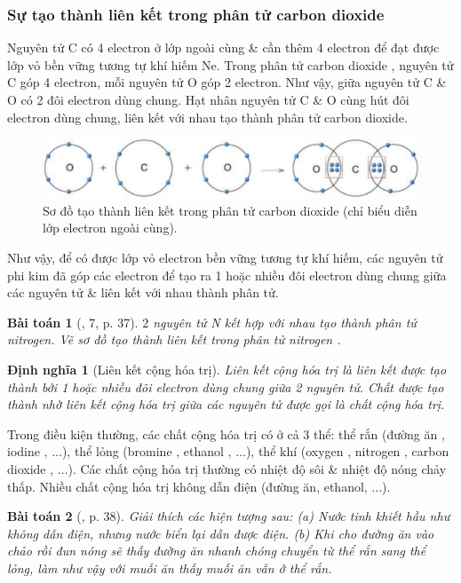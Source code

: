 \documentclass{article}
\newtheorem{baitoan}{Bài toán}
\newtheorem{dinhnghia}{Định nghĩa}
\begin{document}
\subsubsection{Sự tạo thành liên kết trong phân tử carbon dioxide}
Nguyên tử C có 4 electron ở lớp ngoài cùng \& cần thêm 4 electron để đạt được lớp vỏ bền vững tương tự khí hiếm Ne. Trong phân tử carbon dioxide , nguyên tử C góp 4 electron, mỗi nguyên tử O góp 2 electron. Như vậy, giữa nguyên tử C \& O có 2 đôi electron dùng chung. Hạt nhân nguyên tử C \& O cùng hút đôi electron dùng chung, liên kết với nhau tạo thành phân tử carbon dioxide.
\begin{figure}[H]
	\centering
	\includegraphics[scale=0.3]{carbon_dioxide}
	\caption{Sơ đồ tạo thành liên kết trong phân tử carbon dioxide  (chỉ biểu diễn lớp electron ngoài cùng).}
\end{figure}
Như vậy, để có được lớp vỏ electron bền vững tương tự khí hiếm, các nguyên tử phi kim đã góp các electron để tạo ra 1 hoặc nhiều đôi electron dùng chung giữa các nguyên tử \& liên kết với nhau thành phân tử.

\begin{baitoan}[\cite{SGK_KHTN_7_Canh_Dieu}, 7, p. 37]
	$2$ nguyên tử \emph{N} kết hợp với nhau tạo thành phân tử nitrogen. Vẽ sơ đồ tạo thành liên kết trong phân tử nitrogen \emph{}.
\end{baitoan}

\begin{dinhnghia}[Liên kết cộng hóa trị]
	\emph{Liên kết cộng hóa trị} là liên kết được tạo thành bởi 1 hoặc nhiều đôi electron dùng chung giữa 2 nguyên tử. Chất được tạo thành nhờ liên kết cộng hóa trị giữa các nguyên tử được gọi là \emph{chất cộng hóa trị}.
\end{dinhnghia}
Trong điều kiện thường, các chất cộng hóa trị có ở cả 3 thể: thể rắn (đường ăn , iodine , $\ldots$), thể lỏng (bromine , ethanol , $\ldots$), thể khí (oxygen , nitrogen , carbon dioxide , $\ldots$). Các chất cộng hóa trị thường có nhiệt độ sôi \& nhiệt độ nóng chảy thấp. Nhiều chất cộng hóa trị không dẫn điện (đường ăn, ethanol, $\ldots$).

\begin{baitoan}[\cite{SGK_KHTN_7_Canh_Dieu}, p. 38]
	Giải thích các hiện tượng sau: (a) Nước tinh khiết hầu như không dẫn điện, nhưng nước biển lại dẫn được điện. (b) Khi cho đường ăn vào chảo rồi đun nóng sẽ thấy đường ăn nhanh chóng chuyển từ thể rắn sang thể lỏng, làm như vậy với muối ăn thấy muối ăn vẫn ở thể rắn.
\end{baitoan}
\end{document}
